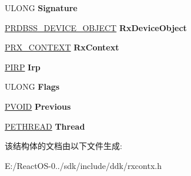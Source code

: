 \begin{DoxyCompactItemize}
\begin{tabbing}
\end{tabbing}\item 
\mbox{\label{struct___r_x___t_o_p_l_e_v_e_l_i_r_p___c_o_n_t_e_x_t_ae8897d9af8023859fe6c8443a1ceeb07}} 
U\+L\+O\+NG {\bfseries Signature}
\item 
\mbox{\label{struct___r_x___t_o_p_l_e_v_e_l_i_r_p___c_o_n_t_e_x_t_a0524be88755979634918cec59f2f7a58}} 
\hyperlink{struct___r_d_b_s_s___d_e_v_i_c_e___o_b_j_e_c_t}{P\+R\+D\+B\+S\+S\+\_\+\+D\+E\+V\+I\+C\+E\+\_\+\+O\+B\+J\+E\+CT} {\bfseries Rx\+Device\+Object}
\item 
\mbox{\label{struct___r_x___t_o_p_l_e_v_e_l_i_r_p___c_o_n_t_e_x_t_acd4dc87c70c9aa5d3b6181e7cc59d334}} 
\hyperlink{struct___r_x___c_o_n_t_e_x_t}{P\+R\+X\+\_\+\+C\+O\+N\+T\+E\+XT} {\bfseries Rx\+Context}
\item 
\mbox{\label{struct___r_x___t_o_p_l_e_v_e_l_i_r_p___c_o_n_t_e_x_t_a16f1a3b5b18b1c11dc8eead937024432}} 
\hyperlink{interfacevoid}{P\+I\+RP} {\bfseries Irp}
\item 
\mbox{\label{struct___r_x___t_o_p_l_e_v_e_l_i_r_p___c_o_n_t_e_x_t_a7351d53183e42d8c596eb131d0c6ecdb}} 
U\+L\+O\+NG {\bfseries Flags}
\item 
\mbox{\label{struct___r_x___t_o_p_l_e_v_e_l_i_r_p___c_o_n_t_e_x_t_a56c404818c50337da494556794fb6134}} 
\hyperlink{interfacevoid}{P\+V\+O\+ID} {\bfseries Previous}
\item 
\mbox{\label{struct___r_x___t_o_p_l_e_v_e_l_i_r_p___c_o_n_t_e_x_t_a3386c24f53488e847cfb43ec2d671c46}} 
\hyperlink{struct___e_t_h_r_e_a_d}{P\+E\+T\+H\+R\+E\+AD} {\bfseries Thread}
\end{DoxyCompactItemize}


该结构体的文档由以下文件生成\+:\begin{DoxyCompactItemize}
\item 
E\+:/\+React\+O\+S-\/0../sdk/include/ddk/rxcontx.\+h\end{DoxyCompactItemize}

